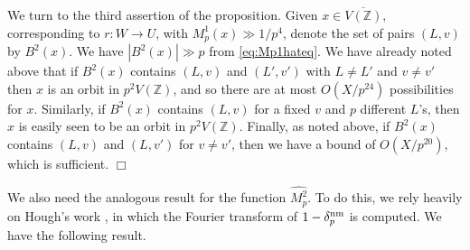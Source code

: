\documentclass{article}
\def\Z{{\mathbb Z}}
\def\nm{{\rm nm}}
\def\Z{{\mathbb Z}}
\def\ol{\overline}
\newenvironment{proof}{\noindent {\bf Proof:}}{$\Box$ \vspace{2 ex}}
\begin{document}
\begin{proof}
We turn to the third assertion of the proposition. Given $x\in \ol{V(\Z)}$, corresponding to $r:W\to U$, with $M_p^1(x)\gg 1/p^4$, denote the set of pairs $(L,v)$ by $B^2(x)$. We have $|B^2(x)|\gg p$ from \eqref{eq:Mp1hateq}. We have already noted above that if $B^2(x)$ contains $(L,v)$ and $(L',v')$ with $L\neq L'$ and $v\neq v'$ then $x$ is an orbit in $p^2V(\Z)$, and so there are at most $O(X/p^{24})$ possibilities for $x$. Similarly, if $B^2(x)$ contains $(L,v)$ for a fixed $v$ and $p$ different $L$'s, then $x$ is easily seen to be an orbit in $p^2V(\Z)$. Finally, as noted above, if $B^2(x)$ contains $(L,v)$ and $(L,v')$ for $v\neq v'$, then we have a bound of $O(X/p^{20})$, which is sufficient.
\end{proof}

We also need the analogous result for the function $\widehat{M_p^2}$. To do this, we rely heavily on Hough's work \cite{hough}, in which the Fourier transform of $1-\delta^{\nm}_p$ is computed.
We have the following result.
\end{document}

